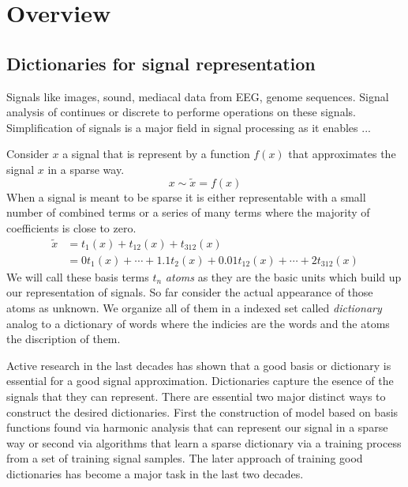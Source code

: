 \chapter{Overview}

\section{Dictionaries for signal representation}
\label{sec:dicts}
Signals like images, sound, mediacal data from EEG, genome sequences. 
Signal analysis of continues or discrete to performe operations on these
signals. Simplification of signals is a major field in signal processing as it
enables ... \Todo{}

Consider $x$ a signal that is represent by a
function $f(x)$ that approximates the signal $x$ in a sparse way.
\begin{equation*}
x \sim \tilde{x} = f\left(x\right)
\end{equation*}
When a signal is meant to be sparse it is either representable with a small
number of combined terms or a series of many terms where the majority of
coefficients is close to zero. 
\begin{equation*}
\begin{split}
\tilde{x} & = t_{1}(x) + t_{12}(x) + t_{312}(x)\\
& = 0t_{1}(x) + \cdots + 1.1t_{2}(x) + 0.01t_{12}(x) + \cdots +
2t_{312}(x)
\end{split}
\end{equation*}
We will call these basis terms $t_n$ \emph{atoms} as they are the basic units
which build up our representation of signals. So far consider the actual
appearance of those atoms as unknown. We 
organize all of them in a indexed set called \emph{dictionary} analog to a
dictionary of words where the indicies are the words and the atoms the
discription of them. 

Active research \cite{} in the last decades has shown that a good basis or
dictionary is essential for a good signal approximation. Dictionaries capture
the esence of the signals that they can represent. There are essential two major
distinct ways to construct the  desired dictionaries. First the construction of
model based on basis functions found via harmonic analysis that can represent
our signal in a sparse way or second via algorithms that learn a sparse
dictionary via a training process from a set of training signal samples. The
later approach of training good dictionaries has become a major task in the last
two decades\cite{Mairal2010}.



